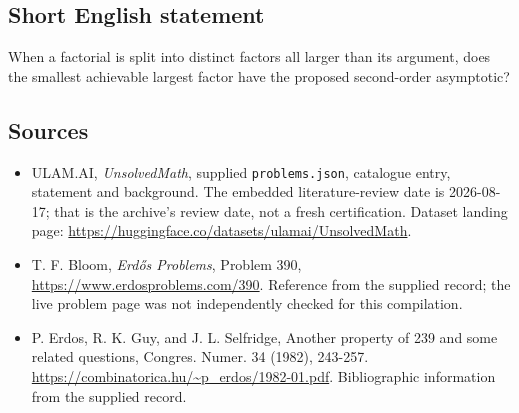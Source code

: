 \documentclass[11pt,a4paper]{article}
\begin{document}
\subsection{Short English statement}

When a factorial is split into distinct factors all larger than its argument, does the smallest achievable largest factor have the proposed second-order asymptotic?

\subsection{Sources}

{\small

\begin{itemize}

\item[\hypertarget{source:statement:1}{S1}] ULAM.AI, \emph{UnsolvedMath}, supplied \texttt{problems.json}, catalogue entry, statement and background. The embedded literature-review date is 2026-08-17; that is the archive’s review date, not a fresh certification. Dataset landing page: \url{https://huggingface.co/datasets/ulamai/UnsolvedMath}.

\item[\hypertarget{source:statement:2}{S2}] T. F. Bloom, \emph{Erdős Problems}, Problem 390, \url{https://www.erdosproblems.com/390}. Reference from the supplied record; the live problem page was not independently checked for this compilation.

\item[\hypertarget{source:statement:3}{S3}] P. Erdos, R. K. Guy, and J. L. Selfridge, Another property of 239 and some related questions, Congres. Numer. 34 (1982), 243-257. \url{https://combinatorica.hu/~p_erdos/1982-01.pdf}. Bibliographic information from the supplied record.

\end{itemize}

}

\label{end:statement}
\end{document}
